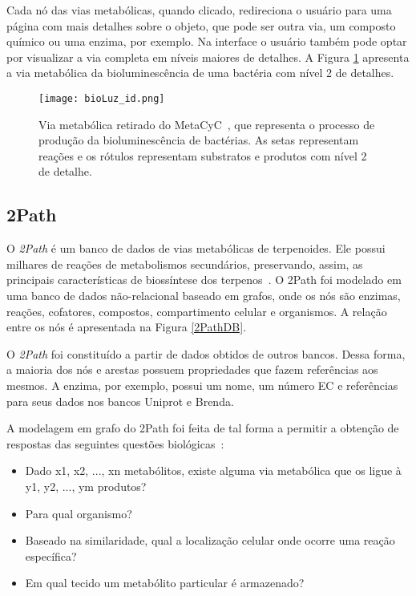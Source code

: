 \indent Cada nó das vias metabólicas, quando clicado, redireciona o usuário para uma página com mais detalhes sobre o objeto, que pode ser outra via, um composto químico ou uma enzima, por exemplo. Na interface o usuário também pode optar por visualizar a via completa em níveis maiores de detalhes. A Figura \ref{bioLuz_id} apresenta a via metabólica da bioluminescência de uma bactéria com nível 2 de detalhes. \\
\newpage
\begin{figure}[!h]
\centering
\texttt{[image: bioLuz\_id.png]}
\caption{Via metabólica retirado do MetaCyC~\cite{examplePathway}, que representa o processo de produção da bioluminescência de bactérias. As setas representam reações e os rótulos representam substratos e produtos com nível 2 de detalhe.}
\label{bioLuz_id}
\end{figure}
\break


\subsection{2Path}

\indent O \textit{2Path} é um banco de dados de vias metabólicas de terpenoides. Ele possui milhares de reações de metabolismos secundários, preservando, assim, as principais características de biossíntese dos terpenos~\cite{waldeyr}. O 2Path foi modelado em uma banco de dados não-relacional baseado em grafos, onde os nós são enzimas, reações, cofatores, compostos, compartimento celular e organismos. A relação entre os nós é apresentada na Figura \ref{2PathDB}.

\indent O \textit{2Path} foi constituído a partir de dados obtidos de outros bancos. Dessa forma, a maioria dos nós e arestas possuem propriedades que fazem referências aos mesmos. A enzima, por exemplo, possui um nome, um número EC e referências para seus dados nos bancos Uniprot e Brenda. 


\indent A modelagem em grafo do 2Path foi feita de tal forma a permitir a obtenção de respostas das seguintes questões biológicas~\cite{waldeyr}:	

\begin{itemize}
\item Dado x{\small 1}, x{\small 2}, ..., x{\small n} metabólitos, existe alguma via metabólica que os ligue à y{\small 1}, y{\small 2}, ..., y{\small m} produtos?
\item Para qual organismo?
\item Baseado na similaridade, qual a localização celular onde ocorre uma reação específica?
\item Em qual tecido um metabólito particular é armazenado?
\end{itemize}

